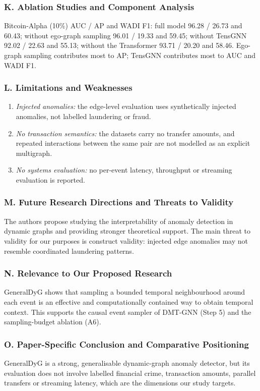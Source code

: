 \documentclass[11pt,a4paper]{article}
\begin{document}
\subsubsection*{K. Ablation Studies and Component Analysis}
Bitcoin-Alpha (10\%) AUC / AP and WADI F1: full model 96.28 / 26.73 and 60.43; without ego-graph sampling 96.01 / 19.33 and 59.45; without TensGNN 92.02 / 22.63 and 55.13; without the Transformer 93.71 / 20.20 and 58.46. Ego-graph sampling contributes most to AP; TensGNN contributes most to AUC and WADI F1.

\subsubsection*{L. Limitations and Weaknesses}
\begin{enumerate}[leftmargin=*]
    \item \textit{Injected anomalies:} the edge-level evaluation uses synthetically injected anomalies, not labelled laundering or fraud.
    \item \textit{No transaction semantics:} the datasets carry no transfer amounts, and repeated interactions between the same pair are not modelled as an explicit multigraph.
    \item \textit{No systems evaluation:} no per-event latency, throughput or streaming evaluation is reported.
\end{enumerate}

\subsubsection*{M. Future Research Directions and Threats to Validity}
The authors propose studying the interpretability of anomaly detection in dynamic graphs and providing stronger theoretical support. The main threat to validity for our purposes is construct validity: injected edge anomalies may not resemble coordinated laundering patterns.

\subsubsection*{N. Relevance to Our Proposed Research}
GeneralDyG shows that sampling a bounded temporal neighbourhood around each event is an effective and computationally contained way to obtain temporal context. This supports the causal event sampler of DMT-GNN (Step 5) and the sampling-budget ablation (A6).

\subsubsection*{O. Paper-Specific Conclusion and Comparative Positioning}
GeneralDyG is a strong, generalisable dynamic-graph anomaly detector, but its evaluation does not involve labelled financial crime, transaction amounts, parallel transfers or streaming latency, which are the dimensions our study targets.
\end{document}
